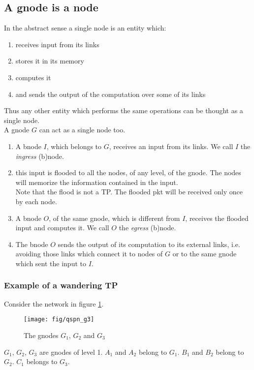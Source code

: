 \documentclass[a4paper]{article}
\begin{document}
\subsection{A gnode is a node}
In the abstract sense a single node is an entity which:
\begin{enumerate}
	\item receives input from its links
	\item stores it in its memory
	\item computes it
	\item and sends the output of the computation over some of its links
\end{enumerate}
Thus any other entity which performs the same operations can be thought as a
single node.\\
A gnode $G$ can act as a single node too.
\begin{enumerate}
	\item A bnode $I$, which belongs to $G$, receives an input from its
		links. We call $I$ the \emph{ingress} (b)node.
	\item this input is flooded to all the nodes, of any level, of the
		gnode. The nodes will memorize the information contained in
		the input.\\
		Note that the flood is not a TP. The flooded pkt will be
		received only once by each node.
	\item A bnode $O$, of the same gnode, which is different from $I$,
		receives the flooded input and computes it.
		We call $O$ the \emph{egress} (b)node.
	\item The bnode $O$ sends the output of its computation to its
		external links, i.e. avoiding those links which connect it to
		nodes of $G$ or to the same gnode which sent the input to $I$.
\end{enumerate}

\subsubsection{Example of a wandering TP}
Consider the network in figure \ref{fig:qspn_g3}.\\
\begin{figure}[h]
	\begin{center}
		\texttt{[image: fig/qspn\_g3]}
	\end{center}
	\caption{The gnodes $G_1$, $G_2$ and $G_3$}
	\label{fig:qspn_g3}
\end{figure}
$G_1$, $G_2$, $G_3$ are gnodes of level 1. $A_1$ and $A_2$ belong to $G_1$. $B_1$ and $B_2$ belong to
$G_2$. $C_1$ belongs to $G_3$.\\
\end{document}
